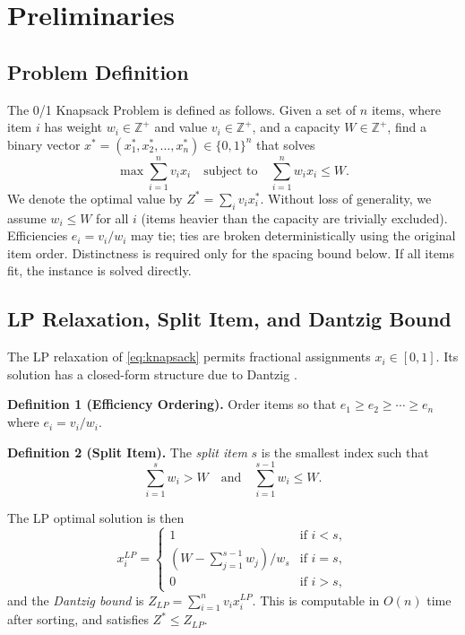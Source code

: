 \documentclass[pdflatex,sn-mathphys-num]{sn-jnl}
\begin{document}
\section{Preliminaries}

\subsection{Problem Definition}

The 0/1 Knapsack Problem is defined as follows. Given a set of $n$ items, where item $i$ has weight $w_i \in \mathbb{Z}^+$ and value $v_i \in \mathbb{Z}^+$, and a capacity $W \in \mathbb{Z}^+$, find a binary vector $x^* = (x_1^*, x_2^*, \ldots, x_n^*) \in \{0,1\}^n$ that solves
\begin{equation}
    \max \sum_{i=1}^{n} v_i x_i \quad \text{subject to} \quad \sum_{i=1}^{n} w_i x_i \leq W.
    \label{eq:knapsack}
\end{equation}
We denote the optimal value by $Z^* = \sum_{i} v_i x_i^*$. Without loss of generality, we assume $w_i \leq W$ for all $i$ (items heavier than the capacity are trivially excluded). Efficiencies $e_i=v_i/w_i$ may tie; ties are broken deterministically using the original item order. Distinctness is required only for the spacing bound below. If all items fit, the instance is solved directly.

\subsection{LP Relaxation, Split Item, and Dantzig Bound}

The LP relaxation of \eqref{eq:knapsack} permits fractional assignments $x_i \in [0,1]$. Its solution has a closed-form structure due to Dantzig \cite{ref1}.

\textbf{Definition 1 (Efficiency Ordering).} Order items so that $e_1 \ge e_2 \ge \cdots \ge e_n$ where $e_i = v_i / w_i$.

\textbf{Definition 2 (Split Item).} The \textit{split item} $s$ is the smallest index such that
\begin{equation}
    \sum_{i=1}^{s} w_i > W \quad \text{and} \quad \sum_{i=1}^{s-1} w_i \leq W.
    \label{eq:split}
\end{equation}

The LP optimal solution is then
\begin{equation}
    x_i^{LP} = \begin{cases}
    1 & \text{if } i < s, \\
    (W - \sum_{j=1}^{s-1} w_j) / w_s & \text{if } i = s, \\
    0 & \text{if } i > s,
    \end{cases}
    \label{eq:lpsol}
\end{equation}
and the \textit{Dantzig bound} is $Z_{LP} = \sum_{i=1}^{n} v_i x_i^{LP}$. This is computable in $O(n)$ time after sorting, and satisfies $Z^* \leq Z_{LP}$.
\end{document}
